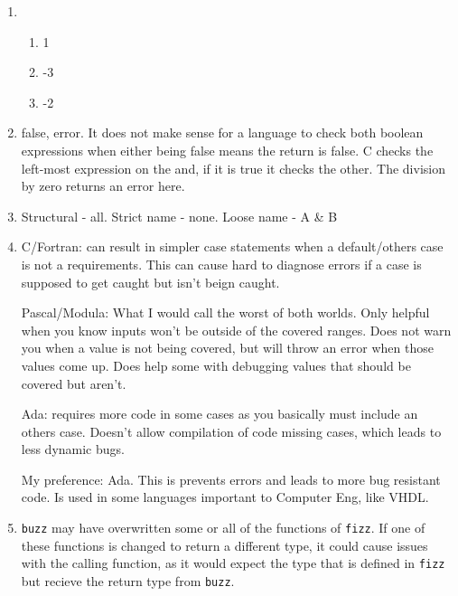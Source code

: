\documentclass[12pt]{article}
\begin{document}
\begin{center}
\begin{enumerate}
\begin{enumerate}
\begin{lstlisting}
				\end{lstlisting}
			\end{enumerate}
			\item \begin{enumerate}
				\item 1
				\item -3
				\item -2
			\end{enumerate}
			\item false, error. It does not make sense for a language to check both boolean expressions when either being false means the return is false. C checks the left-most expression on the and, if it is true it checks the other. The division by zero returns an error here. 
			\item Structural - all. Strict name - none. Loose name - A \& B
			\item C/Fortran: can result in simpler case statements when a default/others case is not a requirements. This can cause hard to diagnose errors if a case is supposed to get caught but isn't beign caught. 
			
			Pascal/Modula: What I would call the worst of both worlds. Only helpful when you know inputs won't be outside of the covered ranges. Does not warn you when a value is not being covered, but will throw an error when those values come up. Does help some with debugging values that should be covered but aren't.
			
			Ada: requires more code in some cases as you basically must include an others case. Doesn't allow compilation of code missing cases, which leads to less dynamic bugs.
			
			My preference: Ada. This is prevents errors and leads to more bug resistant code. Is used in some languages important to Computer Eng, like VHDL.
			
			\item \texttt{buzz} may have overwritten some or all of the functions of \texttt{fizz}. If one of these functions is changed to return a different type, it could cause issues with the calling function, as it would expect the type that is defined in \texttt{fizz} but recieve the return type from \texttt{buzz}.
		\end{enumerate}
	\end{center}
\end{document}
